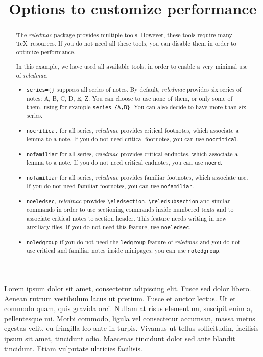 \documentclass{article}
\begin{document}
\begin{english}
\date{}
\title{Options to customize performance}
\maketitle
\begin{abstract}
The \emph{reledmac} package provides multiple tools. However, these tools require many \TeX\ resources. If you do not need all these tools, you can disable them in order to optimize performance.

In this example, we have used all available tools, in order to enable a very minimal use of \emph{reledmac}.

\begin{itemize}
  \item\verb+series={}+ suppress all series of notes. By default, \emph{reledmac} provides six series of notes: A, B, C, D, E, Z. You can choose to use none of them, or only some of them, using for example \verb+series={A,B}+. You can also decide to have more than six series.
  \item\verb+nocritical+ for all series, \emph{reledmac} provides critical footnotes, which associate a lemma to a note. If you do not need critical footnotes, you can use \verb+nocritical+.
  \item\verb+nofamiliar+ for all series, \emph{reledmac} provides critical endnotes, which associate a lemma to a note. If you do not need critical endnotes, you can use \verb+noend+.
  \item\verb+nofamiliar+ for all series, \emph{reledmac} provides familiar footnotes, which associate use. If you do not need familiar footnotes, you can use \verb+nofamiliar+.
  \item\verb+noeledsec+, \emph{reledmac} provides \verb+\eledsection+, \verb+\reledsubsection+ and similar commands in order to use sectioning commands inside numbered texts and to associate critical notes to section header. This feature needs writing in new auxiliary files. If you do not need this feature, use \verb+noeledsec+.
  \item\verb+noledgroup+ if you do not need the \verb+ledgroup+ feature of \emph{reledmac} and you do not use critical and familiar notes inside minipages, you can use \verb+noledgroup+.
\end{itemize}


\end{abstract}
\end{english}

\beginnumbering
\pstart
Lorem ipsum dolor sit amet, consectetur adipiscing elit. Fusce sed dolor libero. Aenean rutrum vestibulum lacus ut pretium. Fusce et auctor lectus. Ut et commodo quam, quis gravida orci. Nullam at risus elementum, suscipit enim a, pellentesque mi. Morbi commodo, ligula vel consectetur accumsan, massa metus egestas velit, eu fringilla leo ante in turpis. Vivamus ut tellus sollicitudin, facilisis ipsum sit amet, tincidunt odio. Maecenas tincidunt dolor sed ante blandit tincidunt. Etiam vulputate ultricies facilisis.
\pend
\endnumbering
\end{document}
